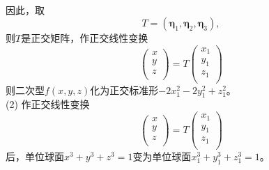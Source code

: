 \begin{enumerate}[1~]
\begin{solution}
\begin{align*}
\end{align*}
因此，取\[
T=(\boldsymbol{\eta}_1, \boldsymbol{\eta}_2, \boldsymbol{\eta}_3),
\]
则$T$是正交矩阵，作正交线性变换\[
\left( \begin{array}{c}
	x\\
	y\\
	z\\
\end{array} \right) =T\left( \begin{array}{c}
	x_1\\
	y_1\\
	z_1\\
\end{array} \right) 
\]
则二次型$f(x, y, z)$化为正交标准形$-2x_1^2-2y_1^2+z_1^2$。\\
(2) 
作正交线性变换\[
\left( \begin{array}{c}
	x\\
	y\\
	z\\
\end{array} \right) =T\left( \begin{array}{c}
	x_1\\
	y_1\\
	z_1\\
\end{array} \right) 
\]
后，单位球面$x ^ { 3 } + y ^ { 3 } + z ^ { 3 } = 1$变为单位球面$x_1 ^ { 3 } + y_1 ^ { 3 } + z_1 ^ { 3 } = 1$。
\end{solution}


\end{enumerate}
